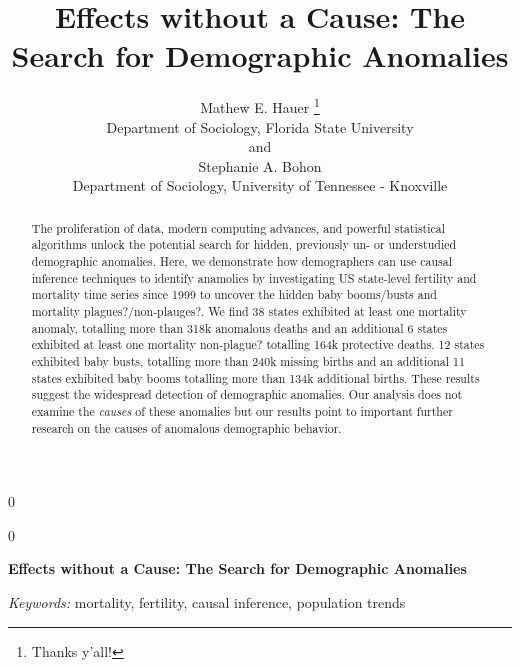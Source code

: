 \documentclass[12pt]{article}
\newcommand{\blind}{0}
\begin{document}
\def\spacingset#1{\renewcommand{\baselinestretch}%
{#1}\small\normalsize} \spacingset{1}



\blind
{
  \title{\bf Effects without a Cause: The Search for Demographic Anomalies}

  \author{
        Mathew E. Hauer \thanks{Thanks y'all!} \\
    Department of Sociology, Florida State University\\
     and \\     Stephanie A. Bohon \\
    Department of Sociology, University of Tennessee - Knoxville\\
      }
  \maketitle
} \fi

\blind
{
  \bigskip
  \bigskip
  \bigskip
  \begin{center}
    {\LARGE\bf Effects without a Cause: The Search for Demographic Anomalies}
  \end{center}
  \medskip
} \fi

\bigskip
\begin{abstract}
\noindent%
The proliferation of data, modern computing advances, and powerful
statistical algorithms unlock the potential search for hidden,
previously un- or understudied demographic anomalies. Here, we demonstrate how demographers can use causal inference techniques to identify anamolies by 
investigating US state-level fertility and mortality time series since
1999 to uncover the hidden baby booms/busts and mortality
plagues?/non-plauges?. We find 38 states exhibited at least one
mortality anomaly, totalling more than 318k anomalous deaths and an
additional 6 states exhibited at least one mortality non-plague?
totalling 164k protective deaths. 12 states exhibited baby busts,
totalling more than 240k missing births and an additional 11 states
exhibited baby booms totalling more than 134k additional births. These
results suggest the widespread detection of demographic anomalies. Our
analysis does not examine the \emph{causes} of these anomalies but our
results point to important further research on the causes of anomalous
demographic behavior.\\
\end{abstract}

\noindent%
{\it Keywords:} mortality, fertility, causal inference, population trends
\vfill
\end{document}
